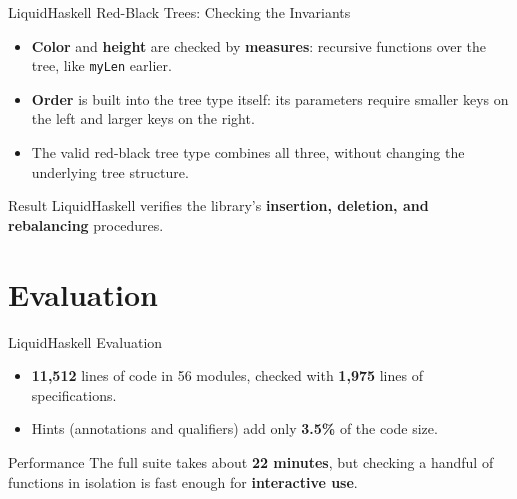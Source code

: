 \documentclass[aspectratio=169]{beamer}
\let\originaltexttt\texttt
\renewcommand{\texttt}[1]{%
  \begingroup
  \setlength{\fboxsep}{2pt}%
  \colorbox{themeTrack!65}{%
    \textcolor{themeText}{\originaltexttt{#1}}%
  }%
  \endgroup
}
\begin{document}
\begin{frame}{LiquidHaskell Red-Black Trees: Checking the Invariants}
	\begin{itemize}
		\item \textbf{Color} and \textbf{height} are checked by \textbf{measures}: recursive functions over the tree, like \texttt{myLen} earlier.
		\item \textbf{Order} is built into the tree type itself: its parameters require smaller keys on the left and larger keys on the right.
		\item The valid red-black tree type combines all three, without changing the underlying tree structure.
	\end{itemize}

	\begin{exampleblock}{Result}
		\vspace{0.1em}
		LiquidHaskell verifies the library's \textbf{insertion, deletion, and rebalancing} procedures.
	\end{exampleblock}
\end{frame}

\section{Evaluation}

\begin{frame}{LiquidHaskell Evaluation}
	\begin{itemize}
		\item \textbf{11,512} lines of code in 56 modules, checked with \textbf{1,975} lines of specifications.
		\item Hints (annotations and qualifiers) add only \textbf{3.5\%} of the code size.
	\end{itemize}

	\begin{exampleblock}{Performance}
		\vspace{0.1em}
		The full suite takes about \textbf{22 minutes}, but checking a handful of functions in isolation is fast enough for \textbf{interactive use}.
	\end{exampleblock}
\end{frame}
\end{document}
